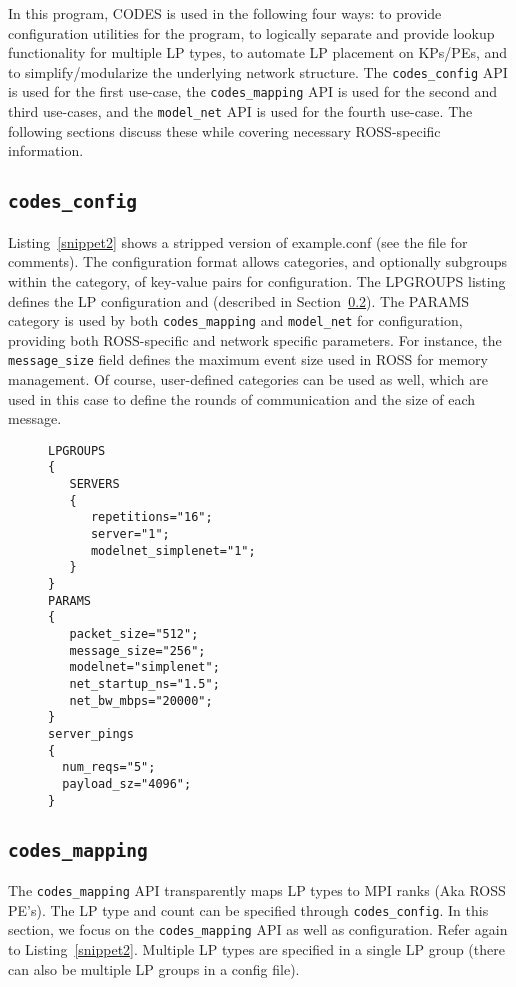 \documentclass[conference,10pt,compsocconf,onecolumn]{IEEEtran}
\newcommand{\codesmapping}[1]{\texttt{codes\_mapping}}
\newcommand{\codesconfig}[1]{\texttt{codes\_config}}
\newcommand{\codesmodelnet}[1]{\texttt{model\_net}}
\begin{document}
In this program, CODES is used in the following four ways: to provide
configuration utilities for the program, to logically separate and provide
lookup functionality for multiple LP types, to automate LP placement on KPs/PEs,
and to simplify/modularize the underlying network structure. The \codesconfig{}
API is used for the first use-case, the \codesmapping{} API is used for
the second and third use-cases, and the \codesmodelnet{} API is used for the
fourth use-case. The following sections discuss these while covering necessary
ROSS-specific information.

\subsection{\codesconfig{}}

Listing~\ref{snippet2} shows a stripped version of example.conf (see the file
for comments). The configuration format allows categories, and optionally
subgroups within the category, of key-value pairs for configuration. The LPGROUPS
listing defines the LP configuration and (described in
Section~\ref{subsec:codes_mapping}). The PARAMS category is used by both
\codesmapping{} and \codesmodelnet{} for configuration, providing both ROSS-specific and
network specific parameters. For instance, the \texttt{message\_size} field defines the
maximum event size used in ROSS for memory management. Of course, user-defined
categories can be used as well, which are used in this case to define the rounds
of communication and the size of each message.

\begin{figure}
\begin{lstlisting}[caption=example configuration file for CODES LP mapping, label=snippet2]
LPGROUPS
{
   SERVERS
   {
      repetitions="16";
      server="1";
      modelnet_simplenet="1";
   }
}
PARAMS
{
   packet_size="512";
   message_size="256";
   modelnet="simplenet";
   net_startup_ns="1.5";
   net_bw_mbps="20000";
}
server_pings
{
  num_reqs="5";
  payload_sz="4096";
} 
\end{lstlisting}
\end{figure} 


\subsection{\codesmapping{}}
\label{subsec:codes_mapping}

The \codesmapping{} API transparently maps LP types to MPI ranks (Aka ROSS PE's).
The LP type and count can be specified through \codesconfig{}. In this
section, we focus on the \codesmapping{} API as well as configuration. Refer again
to Listing~\ref{snippet2}. Multiple LP types are specified in a single LP group
(there can also be multiple LP groups in a config file).
\end{document}
